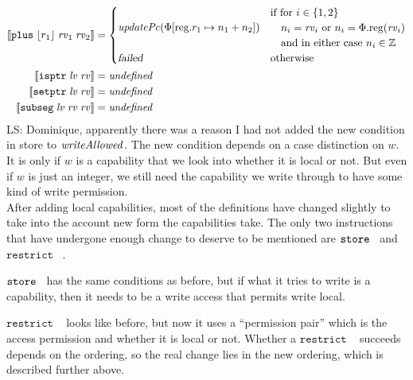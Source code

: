 \documentclass[a4paper]{article}
\newcommand{\update}[2]{[#1 \mapsto #2]}
\newcommand{\sem}[1]{\left\llbracket #1 \right\rrbracket}
\newcommand{\undefined}{\mathit{undefined}}
\newcommand\lau[1]{{\color{purple} \sf \footnotesize {LS: #1}}\\}
\newcommand{\var}[1]{\mathit{#1}}
\newcommand{\rv}{\var{rv}}
\newcommand{\lv}{\var{lv}}
\newcommand{\plainproj}[1]{\mathrm{#1}}
\newcommand{\memreg}[1][\Phi]{#1.\plainproj{reg}}
\newcommand{\updateReg}[3][\Phi]{#1\update{\plainproj{reg}.#2}{#3}}
\newcommand{\failed}{\textsl{failed}}
\newcommand{\plainfun}[2]{
  \ifthenelse{\equal{#2}{}}
             {\mathit{#1}}
             {\mathit{#1}(#2)}
}
\newcommand{\writeAllowed}[1]{\plainfun{writeAllowed}{#1}}
\newcommand{\stdUpdatePc}[1]{\plainfun{updatePc}{#1}}
\newcommand{\ints}{\mathbb{Z}}
\newcommand{\refreg}[1]{\lfloor #1 \rfloor}
\newcommand{\zinstr}[1]{\mathtt{#1}}
\newcommand{\twoinstr}[3]{\zinstr{#1} \; #2 \; #3}
\newcommand{\isptr}[2]{\twoinstr{isptr}{#1}{#2}}
\newcommand{\setptr}[2]{\twoinstr{setptr}{#1}{#2}}
\newcommand{\store}[2]{\twoinstr{store}{#1}{#2}}
\newcommand{\threeinstr}[4]{\zinstr{#1} \; #2 \; #3 \; #4}
\newcommand{\restrict}[3]{\threeinstr{restrict}{#1}{#2}{#3}}
\newcommand{\subseg}[3]{\threeinstr{subseg}{#1}{#2}{#3}}
\newcommand{\plus}[3]{\threeinstr{plus}{#1}{#2}{#3}}
\begin{document}
\begin{align*}
  \sem{\plus{\refreg{r_1}}{\rv_1}{\rv_2}}               & =
                                                          \begin{cases}
                                                            \stdUpdatePc{\updateReg{r_1}{n_1+n_2}} &
                                                            \arraycolsep=0pt
                                                            \begin{array}{l}
                                                              \text{if for $i \in \{1,2\}$}\\
                                                              \quad\text{$n_i = \rv_i$ or $n_i = \memreg(\rv_i)$}\\
                                                              \quad\text{and in either case $n_i \in \ints$}
                                                            \end{array}\\
                                                            \failed & \text{otherwise}
                                                          \end{cases}\\
  \sem{\isptr{\lv}{\rv}} & = \undefined \\ 
  \sem{\setptr{\lv}{\rv}} & = \undefined \\ 
  \sem{\subseg{\lv}{\rv}{\rv}} & = \undefined 
\end{align*}
\lau{Dominique, apparently there was a reason I had not added the new condition in store to $\writeAllowed{}$. The new condition depends on a case distinction on $w$. It is only if $w$ is a capability that we look into whether it is local or not. But even if $w$ is just an integer, we still need the capability we write through to have some kind of write permission.}

After adding local capabilities, most of the definitions have changed slightly to take into the account new form the capabilities take. The only two instructions that have undergone enough change to deserve to be mentioned are $\store{}$ and $\restrict{}{}{}$. 

$\store{}$ has the same conditions as before, but if what it tries to write is a capability, then it needs to be a write access that permits write local.

$\restrict{}{}{}$ looks like before, but now it uses a ``permission pair'' which is the access permission and whether it is local or not. Whether a $\restrict{}{}{}$ succeeds depends on the ordering, so the real change lies in the new ordering, which is described further above.
\end{document}
